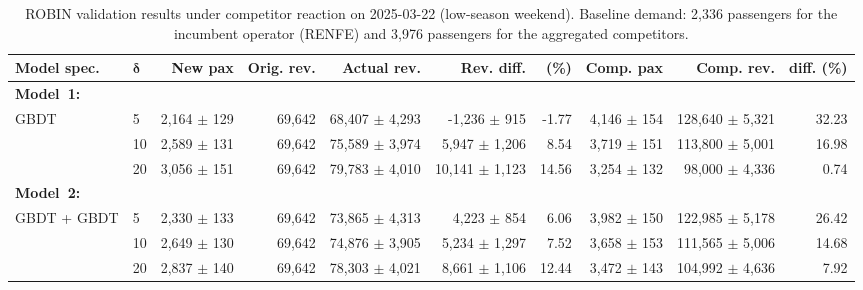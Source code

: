 \begin{table}[!h]
    \centering
    \caption{ROBIN validation results under competitor reaction on 2025-03-22 (low-season weekend). Baseline demand: 2,336 passengers for the incumbent operator (RENFE) and 3,976 passengers for the aggregated competitors.}
    \label{tab:model2_validation_2025_03_22}
    \scriptsize
    \setlength{\tabcolsep}{3pt}
    \begin{tabular}{llrrrrrrrr}
        \toprule
        \textbf{Model spec.}
        & \(\boldsymbol{\delta}\)
        & \textbf{New pax}
        & \textbf{Orig. rev.}
        & \textbf{Actual rev.}
        & \textbf{Rev. diff.}
        & \textbf{(\%)}
        & \textbf{Comp. pax}
        & \textbf{Comp. rev.}
        & \textbf{diff. (\%)} \\
        \midrule
        \multicolumn{10}{l}{\textbf{Model~1:}} \\[1ex]
        \multirow{3}{*}{GBDT} & 5 & 2,164 $\pm$ 129 & 69,642 & 68,407 $\pm$ 4,293 & -1,236 $\pm$ 915 & -1.77 & 4,146 $\pm$ 154 & 128,640 $\pm$ 5,321 & 32.23 \\
         & 10 & 2,589 $\pm$ 131 & 69,642 & 75,589 $\pm$ 3,974 & 5,947 $\pm$ 1,206 & 8.54 & 3,719 $\pm$ 151 & 113,800 $\pm$ 5,001 & 16.98 \\
         & 20 & 3,056 $\pm$ 151 & 69,642 & 79,783 $\pm$ 4,010 & 10,141 $\pm$ 1,123 & 14.56 & 3,254 $\pm$ 132 & 98,000 $\pm$ 4,336 & 0.74 \\
        \midrule
        \multicolumn{10}{l}{\textbf{Model~2:}} \\
        \multirow{3}{*}{GBDT + GBDT} & 5 & 2,330 $\pm$ 133 & 69,642 & 73,865 $\pm$ 4,313 & 4,223 $\pm$ 854 & 6.06 & 3,982 $\pm$ 150 & 122,985 $\pm$ 5,178 & 26.42 \\
         & 10 & 2,649 $\pm$ 130 & 69,642 & 74,876 $\pm$ 3,905 & 5,234 $\pm$ 1,297 & 7.52 & 3,658 $\pm$ 153 & 111,565 $\pm$ 5,006 & 14.68 \\
         & 20 & 2,837 $\pm$ 140 & 69,642 & 78,303 $\pm$ 4,021 & 8,661 $\pm$ 1,106 & 12.44 & 3,472 $\pm$ 143 & 104,992 $\pm$ 4,636 & 7.92 \\
        \bottomrule
    \end{tabular}
\end{table}